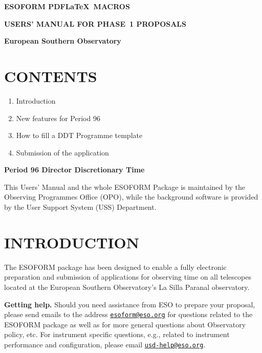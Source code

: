 \documentclass{article}
\begin{document}
\centerline{{\Large{\bf ESOFORM PDF\LaTeX\ MACROS}}}
\bigskip
\centerline{{\Large{\bf USERS' MANUAL FOR PHASE~1 PROPOSALS }}}
\bigskip
\centerline{{\bf European Southern Observatory}}
\vspace{3cm}

\def\period{96}

\section*{CONTENTS} 

\begin{enumerate}  
\item Introduction 
\item New features for Period 96
\item How to fill a DDT Programme template 
\item Submission of the application 
\end{enumerate} 

\vspace{3.0truecm}

\centerline{\large \bf Period 96 Director Discretionary Time }

\vfill

\noindent This Users' Manual and the whole ESOFORM Package is
maintained by the Observing Programmes Office (OPO),
while the background software
is provided by the User Support System (USS) Department.

\break

\section{INTRODUCTION}

The ESOFORM package has been designed to enable a fully
electronic preparation and submission of applications for observing
time on all telescopes located at the European Southern Observatory's
La Silla Paranal observatory.

{\bf Getting help.} Should you need assistance from ESO to prepare
your proposal, please send emails to the address
\href{mailto:esoform@eso.org}{\tt esoform@eso.org} for questions
related to the ESOFORM package as well as for more general questions
about  Observatory policy, etc.
For instrument specific questions, e.g., related to instrument performance
and configuration, please email \href{mailto:usd-help@eso.org}{\tt usd-help@eso.org}.

\end{document}
